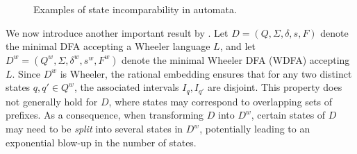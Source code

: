 \begin{example}
\begin{figure}[H]
\begin{subfigure}[b]{0.55\textwidth}
        \caption{}
        \label{fig:incomparability-scenario2}
    \end{subfigure}
    \caption{Examples of state incomparability in automata.}
    \label{fig:incomparability-scenarios-combined}
    \end{figure}
\end{example}

We now introduce another important result by \cite{manziniRationalConstructionWheeler2024}. Let $D = (Q, \Sigma, \delta, s, F)$ denote the minimal DFA accepting a Wheeler language $L$, and let $D^w = (Q^w, \Sigma, \delta^w, s^w, F^w)$ denote the minimal Wheeler DFA (WDFA) accepting $L$. Since $D^w$ is Wheeler, the rational embedding ensures that for any two distinct states $q, q' \in Q^w$, the associated intervals $I_q, I_{q'}$ are disjoint. This property does not generally hold for $D$, where states may correspond to overlapping sets of prefixes. As a consequence, when transforming $D$ into $D^w$, certain states of $D$ may need to be \emph{split} into several states in $D^w$, potentially leading to an exponential blow-up in the number of states.

